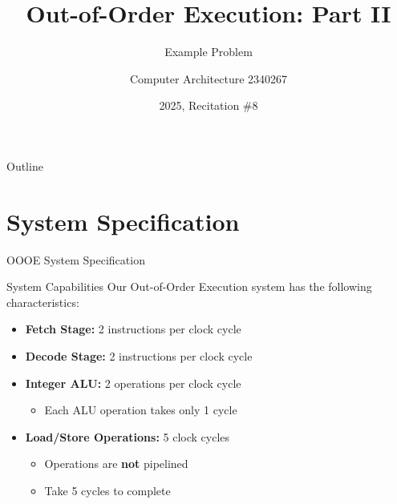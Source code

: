 \documentclass[aspectratio=169,12pt]{beamer}
\title{Out-of-Order Execution: Part II}
\subtitle{Example Problem}
\author{Computer Architecture 2340267}
\date{2025, Recitation \#8}
\begin{document}
\begin{frame}
\titlepage
\end{frame}

\begin{frame}{Outline}
\tableofcontents
\end{frame}

\section{System Specification}

\begin{frame}{OOOE System Specification}
\begin{block}{System Capabilities}
Our Out-of-Order Execution system has the following characteristics:
\end{block}

\begin{itemize}
    \item \textbf{Fetch Stage:} 2 instructions per clock cycle
    \item \textbf{Decode Stage:} 2 instructions per clock cycle  
    \item \textbf{Integer ALU:} 2 operations per clock cycle
    \begin{itemize}
        \item Each ALU operation takes only 1 cycle
    \end{itemize}
    \item \textbf{Load/Store Operations:} 5 clock cycles
    \begin{itemize}
        \item Operations are \textbf{not} pipelined
        \item Take 5 cycles to complete
    \end{itemize}
\end{itemize}
\end{frame}
\end{document}
